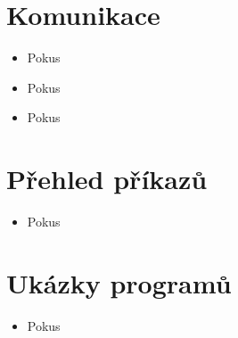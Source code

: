 \documentclass{beamer}
\begin{document}
\section{Komunikace}

\begin{frame}
    \begin{itemize}
        \item Pokus
    \end{itemize}
\end{frame}


\begin{frame}
    \begin{itemize}
        \item Pokus
    \end{itemize}
\end{frame}


\begin{frame}
    \begin{itemize}
        \item Pokus
    \end{itemize}
\end{frame}

\section{Přehled příkazů}

\begin{frame}
    \begin{itemize}
        \item Pokus
    \end{itemize}
\end{frame}

\section{Ukázky programů}

\begin{frame}
    \begin{itemize}
        \item Pokus
    \end{itemize}
\end{frame}
\end{document}
